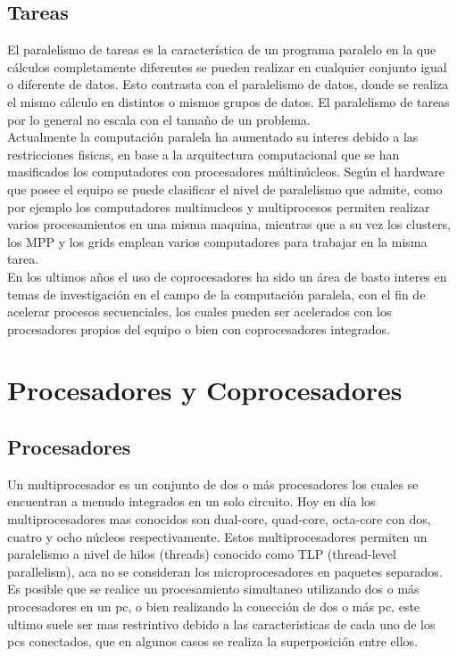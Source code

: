 \subsection{Tareas}

El paralelismo de tareas es la característica de un programa paralelo en la que cálculos completamente diferentes se pueden realizar en cualquier conjunto igual o diferente de datos. Esto contrasta con el paralelismo de datos, donde se realiza el mismo cálculo en distintos o mismos grupos de datos. El paralelismo de tareas por lo general no escala con el tamaño de un problema.
\\

Actualmente la computación paralela ha aumentado su interes debido a las restricciones fisicas, en base a la arquitectura computacional que se han masificados los computadores con procesadores múltinúcleos. Según el hardware que posee el equipo se puede clasificar el nivel de paralelismo que admite, como por ejemplo los computadores multinucleos y multiprocesos permiten realizar varios procesamientos en una misma maquina, mientras que a su vez los clusters, los MPP y los grids emplean varios computadores para trabajar en la misma tarea.
\\
En los ultimos años el uso de coprocesadores ha sido un área de basto interes en temas de investigación en el campo de la computación paralela, con el fin de acelerar procesos secuenciales, los cuales pueden ser acelerados con los procesadores propios del equipo o bien con coprocesadores integrados.

\section{Procesadores y Coprocesadores} 

\subsection{Procesadores}

Un multiprocesador es un conjunto de dos o más procesadores los cuales se encuentran a menudo integrados en un solo circuito. Hoy en día los multiprocesadores mas conocidos son dual-core, quad-core, octa-core con dos, cuatro y ocho núcleos respectivamente. Estos multiprocesadores permiten un paralelismo a nivel de hilos (threads) conocido como TLP (thread-level parallelism), aca no se consideran los microprocesadores en paquetes separados.
\\
Es posible que se realice un procesamiento simultaneo utilizando dos o más procesadores en un pc, o bien realizando la conección de dos o más pc, este ultimo suele ser mas restrintivo debido a las caracteristicas de cada uno de los pcs conectados, que en algunos casos se realiza la superposición entre ellos.

